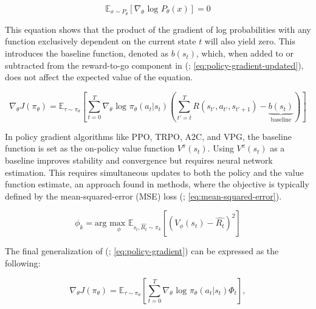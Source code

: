         \begin{equation}
            \mathbb{E}_{x \sim P_{\theta}} [ \nabla_{\theta} \text{ log } P_{\theta}(x)] = 0
            \label{eq:eglp-lemma}
        \end{equation}
        
        \noindent This equation shows that the product of the gradient of log probabilities with any function exclusively dependent on the current state $t$ will also yield zero. This introduces the baseline function, denoted as $b(s_t)$, which, when added to or subtracted from the reward-to-go component in (\textcolor{deepblue}{\cite{SpinningUp2018}; \autoref{eq:policy-gradient-updated}}), does not affect the expected value of the equation.
        
        \begin{equation}
            \nabla_{\theta}J(\pi_{\theta}) = \mathbb{E}_{\tau \sim \pi_{\theta}} \left[ \sum_{t=0}^{T} \nabla_{\theta} \text{ log } \pi_{\theta}(a_t | s_t) \left( \sum_{t'= t}^{T} R(s_{t'}, a_{t'}, s_{t'+1}) - \underbrace{b(s_t)}_{\text{baseline}} \right) \right]
            \label{eq:policy-gradient-baseline}
        \end{equation}
        
        \noindent In policy gradient algorithms like PPO, TRPO, A2C, and VPG, the baseline function is set as the on-policy value function $V^{\pi}(s_t)$. Using $V^{\pi}(s_t)$ as a baseline improves stability and convergence but requires neural network estimation. This requires simultaneous updates to both the policy and the value function estimate, an approach found in  methods, where the objective is typically defined by the mean-squared-error (MSE) loss (\textcolor{deepblue}{\cite{SpinningUp2018}; \autoref{eq:mean-squared-error}}).
        
        \begin{equation}
            \phi_k = \text{arg }\underset{\phi}{\text{max }} \mathbb{E}_{s_t, \hat{R_t} \sim \pi_k} \left [ \left (  V_{\phi}(s_t) - \hat{R_t}    \right )^{2} \right]
            \label{eq:mean-squared-error}
        \end{equation}
        
        \noindent The final generalization of (\textcolor{deepblue}{\cite{SpinningUp2018}; \autoref{eq:policy-gradient}}) can be expressed as the following:
        
        \begin{equation}
            \nabla_{\theta}J(\pi_{\theta}) = \mathbb{E}_{\tau \sim \pi_{\theta}} \left[ \sum_{t=0}^{T} \nabla_{\theta} \text{ log } \pi_{\theta}(a_t | s_t) \Phi_t \right], 
            \label{eq:policy-gradient-general}
        \end{equation}
        
